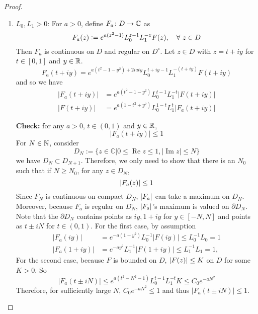 \begin{proof}
	\begin{enumerate}[label=(\roman*)]
		\item $L_0,L_1 > 0$: For $a > 0$, define $F_a \colon D \rightarrow \mathbb{C}$ as
		\begin{equation*}
			F_a(z) \vcentcolon= e^{a(z^2 - 1)}L_0^{z-1}L_1^{-z}F(z),\quad \forall~z \in D
		\end{equation*}
		Then $F_a$ is continuous on $D$ and regular on $D^\circ$. Let $z \in D$ with $z = t+iy$ for $t \in [0,1]$ and $y \in \mathbb{R}$.
		\begin{equation*}
			F_a(t+i y)=e^{a\left(t^2-1-y^2\right)+2 i a t y} L_0^{t+i y-1} L_1^{-(t+i y)} F(t+i y)
		\end{equation*}
		and so we have
		\begin{equation*}
			\begin{aligned}
				\left|F_a(t+i y)\right| & =e^{a\left(t^2-1-y^2\right)} L_0^{t-1} L_1^{-t}|F(t+i y)| \\
				|F(t+i y)| & =e^{a\left(1-t^2+y^2\right)} L_0^{1-t} L_1^t\left|F_a(t+i y)\right|
			\end{aligned}
		\end{equation*}

		\noindent \textbf{Check:} for any $a > 0$, $t \in (0,1)$ and $y \in \mathbb{R}$, 
		\begin{equation*}
			\left|F_a(t+i y)\right| \leq 1
		\end{equation*}
		For $N \in \mathbb{N}$, consider
		\begin{equation*}
			D_N:=\{z \in \mathbb{C}|0 \leq \operatorname{Re} z \leq 1,|\operatorname{Im} z| \leq N\}
		\end{equation*}
		we have $D_N \subset D_{N+1}$. Therefore, we only need to show that there is an $N_0$ such that if $N \geq N_0$, for any $z \in D_N$,
		\begin{equation*}
			\left\lvert F_a(z)\right\lvert \leq 1
		\end{equation*}
		Since $F_N$ is continuous on compact $D_N$, $\left\lvert F_a\right\lvert$ can take a maximum on $D_N$. Moreover, because $F_a$ is regular on $D_N^\circ$, $\left\lvert F_a\right\lvert$'s maximum is valued on $\partial D_N$. Note that the $\partial D_N$ contains points as $iy,1+iy$ for $y \in [-N,N]$ and points as $t \pm i N$ for $t \in (0,1)$. For the first case, by assumption
		\begin{equation*}
			\begin{aligned}
				\left|F_a(i y)\right|&=e^{-a\left(1+y^2\right)} L_0^{-1}|F(i y)| \leq L_0^{-1} L_0=1 \\
				\left|F_a(1+i y)\right|&=e^{-a y^2} L_1^{-1}|F(1+i y)| \leq L_1^{-1} L_1=1,
			\end{aligned}
		\end{equation*}
		For the second case, because $F$ is bounded on $D$, $\left\lvert F(z)\right\lvert \leq  K$ on $D$ for some $K > 0$. So
		\begin{equation*}
			\left|F_a(t \pm i N)\right| \leq e^{a\left(t^2-N^2-1\right)} L_0^{t-1} L_1^{-t} K \leq C_0 e^{-a N^2}
		\end{equation*}
		Therefore, for sufficiently large $N$, $C_0 e^{-aN^2} \leq 1$ and thus $\left|F_a(t \pm i N)\right| \leq 1$. 



\end{enumerate}
\end{proof}

